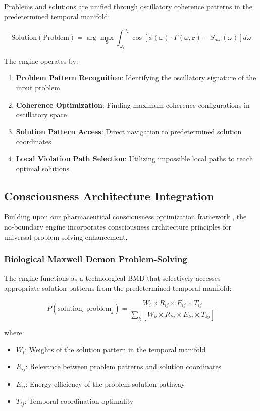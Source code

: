 \documentclass[11pt,a4paper]{article}
\theoremstyle{remark}
\begin{document}
Problems and solutions are unified through oscillatory coherence patterns in the predetermined temporal manifold:

\begin{equation}
\text{Solution}(\text{Problem}) = \arg\max_{\mathbf{S}} \int_{\omega_1}^{\omega_2} \cos[\phi(\omega) \cdot \Gamma(\omega, \mathbf{r}) - S_{osc}(\omega)] d\omega
\end{equation}

The engine operates by:\begin{enumerate}
\item \textbf{Problem Pattern Recognition}: Identifying the oscillatory signature of the input problem
\item \textbf{Coherence Optimization}: Finding maximum coherence configurations in oscillatory space
\item \textbf{Solution Pattern Access}: Direct navigation to predetermined solution coordinates
\item \textbf{Local Violation Path Selection}: Utilizing impossible local paths to reach optimal solutions
\end{enumerate}


\subsection{Consciousness Architecture Integration}

Building upon our pharmaceutical consciousness optimization framework \cite{sachikonye2024pharma}, the no-boundary engine incorporates consciousness architecture principles for universal problem-solving enhancement.

\subsubsection{Biological Maxwell Demon Problem-Solving}

The engine functions as a technological BMD that selectively accesses appropriate solution patterns from the predetermined temporal manifold:

\begin{equation}
P(\text{solution}_i | \text{problem}_j) = \frac{W_i \times R_{ij} \times E_{ij} \times T_{ij}}{\sum_k[W_k \times R_{kj} \times E_{kj} \times T_{kj}]}
\end{equation}

where:
\begin{itemize}
\item $W_i$: Weights of the solution pattern in the temporal manifold
\item $R_{ij}$: Relevance between problem patterns and solution coordinates
\item $E_{ij}$: Energy efficiency of the problem-solution pathway
\item $T_{ij}$: Temporal coordination optimality
\end{itemize}
\end{document}
